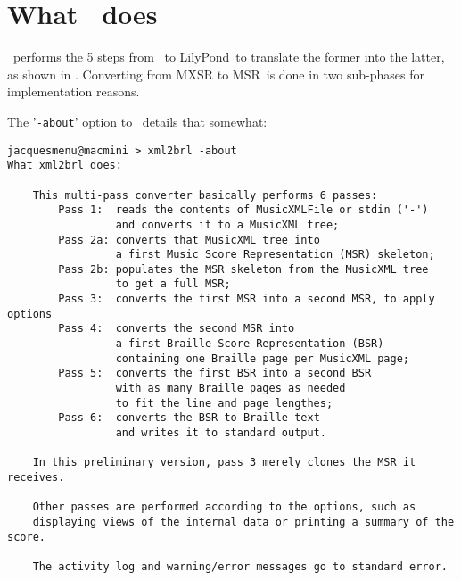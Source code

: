 \section{What \xmlToBrl\ does}

\xmlToBrl\ performs the 5 steps from \mxml\ to LilyPond\ to translate the former into the latter, as shown in . Converting from MXSR to MSR\ is done in two sub-phases for implementation reasons.

The '{\tt -about}' option to \xmlToBrl\ details that somewhat:
\begin{lstlisting}[language=MusicXML]
jacquesmenu@macmini > xml2brl -about
What xml2brl does:

    This multi-pass converter basically performs 6 passes:
        Pass 1:  reads the contents of MusicXMLFile or stdin ('-')
                 and converts it to a MusicXML tree;
        Pass 2a: converts that MusicXML tree into
                 a first Music Score Representation (MSR) skeleton;
        Pass 2b: populates the MSR skeleton from the MusicXML tree
                 to get a full MSR;
        Pass 3:  converts the first MSR into a second MSR, to apply options
        Pass 4:  converts the second MSR into
                 a first Braille Score Representation (BSR)
                 containing one Braille page per MusicXML page;
        Pass 5:  converts the first BSR into a second BSR
                 with as many Braille pages as needed
                 to fit the line and page lengthes;
        Pass 6:  converts the BSR to Braille text
                 and writes it to standard output.

    In this preliminary version, pass 3 merely clones the MSR it receives.

    Other passes are performed according to the options, such as
    displaying views of the internal data or printing a summary of the score.

    The activity log and warning/error messages go to standard error.
\end{lstlisting}
